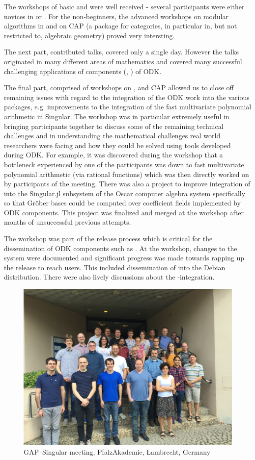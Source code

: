 \begin{event}
The workshops of basic \Singular and \GAP were well received - several 
participants were either novices in \GAP or \Singular.
For the non-beginners, the advanced workshops on modular algorithms in 
\Singular and on CAP (a \GAP package for categories, in particular in,
but not restricted to, algebraic geometry) proved very intersting.

The next part, contributed talks, covered only a single day. However
the talks originated in  many different areas of mathematics and covered
many successful challenging applications of components (\GAP, \Singular)
of ODK.

The final part, comprised of workshops on \GAP, \Singular and CAP
allowed us to close off remaining issues with regard     
to the integration of the ODK work into the various packages, e.g.              
improvements to the integration of the fast multivariate polynomial             
arithmetic in Singular. The workshop was in particular extremely useful in      
bringing participants together to discuss some of the remaining technical       
challenges and in understanding the mathematical challenges real world          
researchers were facing and how they could be solved using tools developed      
during ODK. For example, it was discovered during the workshop that a           
bottleneck experienced by one of the participants was down to fast              
multivariate polynomial arithmetic (via rational functions) which was then      
directly worked on by participants of the meeting. There was also a project     
to improve integration of \Singular into the Singular.jl
 subsystem of the        
Oscar computer algebra system specifically so that Gr\"{o}ber bases could       
be computed over coefficient fields implemented by ODK components. This         
project was finalized and merged at the workshop after months of                
unsuccessful previous attempts.

The \GAP workshop was part of the  release process which is critical
for the dissemination of ODK components such as \libGAP. At the workshop,
changes to the \libGAP system were documented and significant progress was
made towards rapping up the release to reach users. This included
dissemination of \GAP into the Debian distribution. There were also lively
discussions about the \GAP-\Jupyter integration.


\begin{figure}[ht]
  \includegraphics[width=.75\textwidth]{gap-singular-participants}
  \caption*{GAP--Singular meeting, PfalzAkademie, Lambrecht, Germany}
\end{figure}

\end{event}

